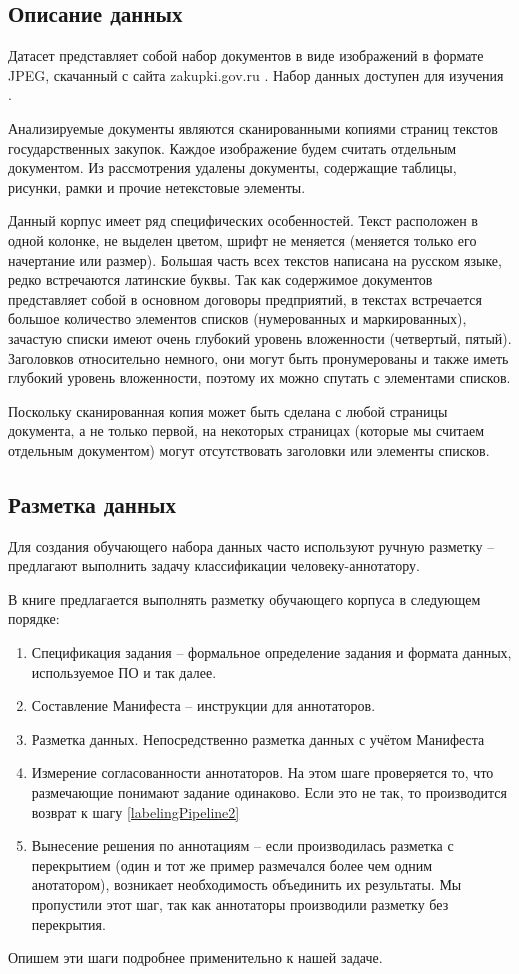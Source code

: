 \subsection{Описание данных}

Датасет представляет собой набор документов в виде изображений в формате JPEG, скачанный с сайта zakupki.gov.ru \cite{zakupki}. Набор данных доступен для изучения \cite{data}. 

Анализируемые документы являются сканированными копиями страниц текстов государственных закупок. Каждое изображение будем считать отдельным документом. Из рассмотрения удалены документы, содержащие таблицы, рисунки, рамки и прочие нетекстовые элементы.

Данный корпус имеет ряд специфических особенностей. Текст расположен в одной колонке, не выделен цветом, шрифт не меняется (меняется только его начертание или размер). Большая часть всех текстов написана на русском языке, редко встречаются латинские буквы. Так как содержимое документов представляет собой в основном договоры предприятий, в текстах встречается большое количество элементов списков (нумерованных и маркированных), зачастую списки имеют очень глубокий уровень вложенности (четвертый, пятый). Заголовков относительно немного, они могут быть пронумерованы и также иметь глубокий уровень вложенности, поэтому их можно спутать с элементами списков.

Поскольку сканированная копия может быть сделана с любой страницы документа, а не только первой, на некоторых страницах (которые мы считаем отдельным документом) могут отсутствовать заголовки или элементы списков.


\subsection{Разметка данных}
Для создания обучающего набора данных часто используют ручную разметку -- предлагают выполнить задачу классификации человеку-аннотатору. 

В книге \cite{pustejovsky2012natural} предлагается выполнять разметку обучающего корпуса в следующем порядке:


\begin{enumerate}
    \item Спецификация задания -- формальное определение задания и формата данных, используемое ПО и так далее. 
    \item \label{labelingPipeline2} Составление Манифеста -- инструкции для аннотаторов. 
    \item Разметка данных. Непосредственно разметка данных с учётом Манифеста
    \item Измерение согласованности аннотаторов. На этом шаге проверяется то, что размечающие понимают задание одинаково. Если это не так, то производится возврат к шагу \ref{labelingPipeline2}
    \item Вынесение решения по аннотациям -- если производилась разметка с перекрытием (один и тот же пример размечался более чем одним анотатором), возникает необходимость объединить их результаты. Мы пропустили этот шаг, так как аннотаторы производили разметку без перекрытия. 
\end{enumerate}
    Опишем эти шаги подробнее применительно к нашей задаче. 
    
